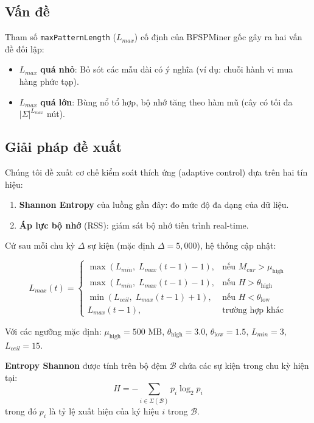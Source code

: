 \documentclass[a4paper,12pt]{report}
\begin{document}
\subsection{Vấn đề}
Tham số \texttt{maxPatternLength} ($L_{max}$) cố định của BFSPMiner gốc gây ra hai vấn đề đối lập:
\begin{itemize}
    \item $L_{max}$ \textbf{quá nhỏ}: Bỏ sót các mẫu dài có ý nghĩa (ví dụ: chuỗi hành vi mua hàng phức tạp).
    \item $L_{max}$ \textbf{quá lớn}: Bùng nổ tổ hợp, bộ nhớ tăng theo hàm mũ (cây có tối đa $|\Sigma|^{L_{max}}$ nút).
\end{itemize}

\subsection{Giải pháp đề xuất}
Chúng tôi đề xuất cơ chế kiểm soát thích ứng (adaptive control) dựa trên hai tín hiệu:
\begin{enumerate}
    \item \textbf{Shannon Entropy} của luồng gần đây: đo mức độ đa dạng của dữ liệu.
    \item \textbf{Áp lực bộ nhớ} (RSS): giám sát bộ nhớ tiến trình real-time.
\end{enumerate}

Cứ sau mỗi chu kỳ $\Delta$ sự kiện (mặc định $\Delta = 5{,}000$), hệ thống cập nhật:

\begin{equation}
    L_{max}(t) = \begin{cases} 
      \max(L_{min},\; L_{max}(t\!-\!1) - 1), & \text{nếu } M_{cur} > \mu_{\text{high}} \\
      \max(L_{min},\; L_{max}(t\!-\!1) - 1), & \text{nếu } H > \theta_{\text{high}} \\
      \min(L_{ceil},\; L_{max}(t\!-\!1) + 1), & \text{nếu } H < \theta_{\text{low}} \\
      L_{max}(t\!-\!1), & \text{trường hợp khác}
   \end{cases}
\end{equation}

Với các ngưỡng mặc định: $\mu_{\text{high}} = 500$ MB, $\theta_{\text{high}} = 3.0$, $\theta_{\text{low}} = 1.5$, $L_{min} = 3$, $L_{ceil} = 15$.

\textbf{Entropy Shannon} được tính trên bộ đệm $\mathcal{B}$ chứa các sự kiện trong chu kỳ hiện tại:
\begin{equation}
    H = -\sum_{i \in \Sigma(\mathcal{B})} p_i \log_2 p_i
\end{equation}
trong đó $p_i$ là tỷ lệ xuất hiện của ký hiệu $i$ trong $\mathcal{B}$.
\end{document}
